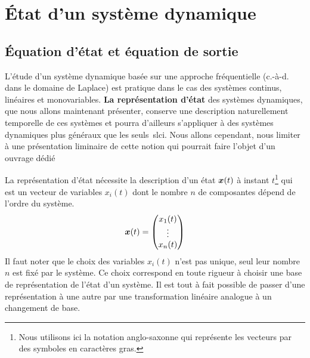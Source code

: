\section{\'Etat d'un système dynamique}
\subsection{\'Equation d'état et équation de sortie}
L'étude d'un système dynamique basée sur une approche fréquentielle (c.-à-d. 
dans le domaine de Laplace) est pratique dans le cas des systèmes continus, 
linéaires et monovariables. \textbf{La représentation d'état} des systèmes 
dynamiques, que nous allons maintenant présenter, conserve une description 
naturellement temporelle de ces systèmes et pourra d'ailleurs s'appliquer 
à des systèmes dynamiques plus généraux que les seuls~\gls{slci}. 
Nous allons cependant, nous limiter à une présentation
liminaire de cette notion qui pourrait faire l'objet d'un ouvrage dédié

La représentation d'état nécessite la description d'un état 
$\boldsymbol{x}(t)$ à instant $t$\footnote{Nous utilisons ici la notation anglo-saxonne 
qui représente les vecteurs par des symboles en caractères gras.} qui est un 
vecteur de variables $x_i(t)$ dont le nombre $n$ de composantes dépend 
de l'ordre du système.
\begin{align*}
    \boldsymbol{x} (t) = \begin{pmatrix}
            x_1(t)\\
            \vdots\\
             x_n(t)
            \end{pmatrix}
\end{align*}
Il faut noter que le choix des variables $x_i(t)$ n'est pas unique, seul leur
nombre $n$ est fixé par le système. Ce choix correspond en toute rigueur
à choisir une base de représentation de l'état d'un système. Il est tout à 
fait possible de passer d'une représentation à une autre par une transformation
linéaire analogue à un changement de base.

